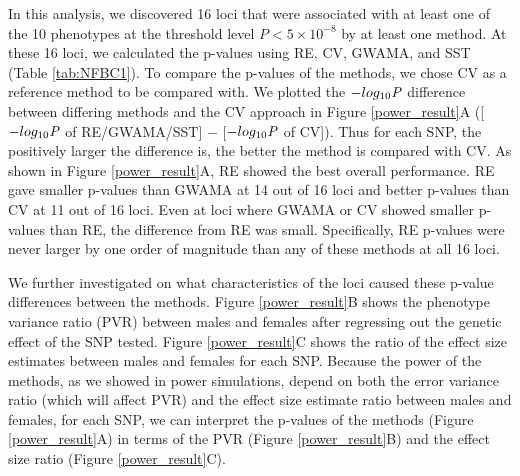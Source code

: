\documentclass[11pt]{article}
\begin{document}
In this analysis, we discovered 16 loci that were associated with
at least one of the 10
phenotypes at the threshold level  $P<5\times10^{-8}$ 
by at least one
method.
At these 16 loci, we calculated the p-values using RE, CV, GWAMA, and SST (Table \ref{tab:NFBC1}).
To compare the p-values of the methods, %
we chose CV as a reference method to be compared with.
We plotted the $-log_{10} \it{P}$ difference between
differing methods and the CV approach in Figure \ref{power_result}A
([$-log_{10} \it{P}$ of RE/GWAMA/SST] $-$ [$-log_{10} \it{P}$ of CV]).
Thus for each SNP, the positively larger the difference is, the better the method is compared 
with CV. 
As shown in Figure \ref{power_result}A, RE showed the best overall performance. %
RE gave smaller p-values than GWAMA at 14 out of 16 loci and better p-values than CV at 11 out of 16 loci. 
Even at loci where GWAMA or CV showed smaller p-values than RE, the
difference from RE was small. 
Specifically, RE p-values were never larger by one order of magnitude than any of these methods at all 16 loci.


We further investigated on what characteristics of the loci caused these p-value differences between the methods.
Figure \ref{power_result}B shows the phenotype variance ratio (PVR) between males and females 
after regressing out the genetic effect of the SNP tested. 
Figure \ref{power_result}C shows the ratio of the effect size estimates between males 
and females for each SNP. 
Because the power of the methods, as we showed in power simulations, depend on both the error variance ratio (which will affect PVR) 
and the effect size estimate ratio between males and females, 
for each SNP, we can interpret the p-values of the methods 
(Figure \ref{power_result}A) in terms of  
the PVR (Figure \ref{power_result}B) and the 
effect size ratio (Figure \ref{power_result}C).
\end{document}
